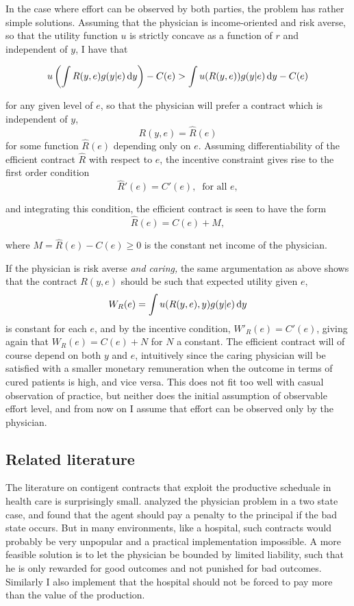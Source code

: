 In the case where effort can be observed by both parties, the problem has rather simple solutions. Assuming that the physician is income-oriented and risk averse, so that the utility function $u$ is strictly concave as a function of $r$ and independent of $y$, I have that

 \[
     u\left(\int R(y,e)g(y|e)\dif y\right)-C(e)>\int u(R(y,e))g(y|e)\dif y-C(e)
 \]

for any given level of $e$, so that the physician will prefer a contract which is independent of $y$,
\[
    R(y,e)=\hat{R}(e)
\]
for some function $\hat{R}(e)$ depending only on $e$. Assuming differentiability of the efficient contract $\hat{R}$ with respect to $e$, the incentive constraint
gives rise to the first order condition
\[
    \hat{R}'(e)= C'(e),\ \text{ for all } e,
\]

and  integrating this condition, the efficient contract is seen to have the form
\[
    \hat{R}(e)=C(e)+M,
\]

where $M=\hat{R}(e)-C(e)\geq 0$ is the constant net income of the physician.

If the physician is risk averse \emph{and caring,} the same argumentation as above shows that the contract $R(y,e)$ should be such that expected utility given $e$, 
 \[
     W_R(e)=\int u(R(y,e),y)g(y|e)\dif y
 \]
is constant for each $e$, and by the incentive condition,
$W'_R(e)=C'(e)$, giving again that $W_R(e)=C(e)+N$ for $N$ a constant. The efficient contract will of course depend on both $y$ and $e$, intuitively since the caring physician will be satisfied with a smaller monetary remuneration when the outcome in terms of cured patients is high, and vice versa. This does not fit too well with casual observation of practice, but neither does the initial assumption of observable effort level, and from now on I assume that effort can be observed only by the physician.


\subsection{Related literature} %
\label{sub:related_litterature}
The literature on contigent contracts that exploit the productive scheduale in health care is surprisingly small. \textcite{Lambert2005No} analyzed the physician problem in a two state case, and found that the agent should pay a penalty to the principal if the bad state occurs. But in many environments, like a hospital, such contracts would probably be very unpopular and a practical implementation impossible. A more feasible solution is to let the physician be bounded by limited liability, such that he is only rewarded for good outcomes and not punished for bad outcomes. Similarly I also implement that the hospital should not be forced to pay more than the value of the production.  


